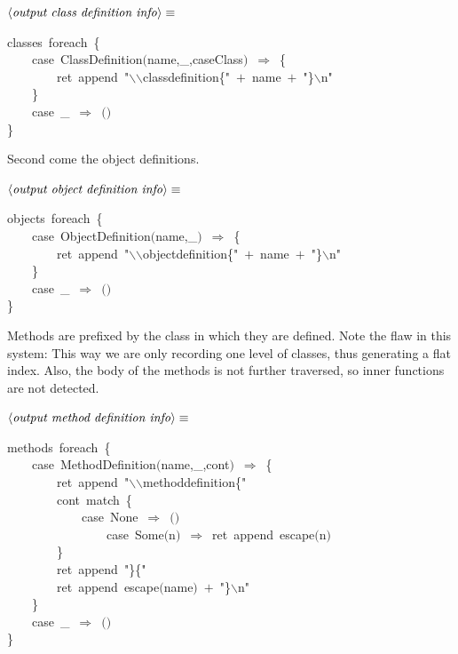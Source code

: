 \documentclass[a4paper,12pt]{article}
\begin{document}
$\left<\mbox{\emph{output class definition info}}\right>\equiv$
\begin{program}classes~foreach~{\small\{}
\\~~~~{\vem case}~ClassDefinition$($name,\_,caseClass$)$~$\Rightarrow$~{\small\{}
\\~~~~~~~~ret~append~"$\backslash$$\backslash$classdefinition{\small\{}"~$+$~name~$+$~"{\small\}}$\backslash$n"
\\~~~~{\small\}}
\\~~~~{\vem case}~\_~$\Rightarrow$~$($$)$
\\{\small\}}
\\[0.5em]\end{program}


Second come the object definitions.

$\left<\mbox{\emph{output object definition info}}\right>\equiv$
\begin{program}objects~foreach~{\small\{}
\\~~~~{\vem case}~ObjectDefinition$($name,\_$)$~$\Rightarrow$~{\small\{}
\\~~~~~~~~ret~append~"$\backslash$$\backslash$objectdefinition{\small\{}"~$+$~name~$+$~"{\small\}}$\backslash$n"
\\~~~~{\small\}}
\\~~~~{\vem case}~\_~$\Rightarrow$~$($$)$
\\{\small\}}
\\[0.5em]\end{program}


Methods are prefixed by the class in which they are defined. Note
the flaw in this system: This way we are only recording one level
of classes, thus generating a flat index. Also, the body of the
methods is not further traversed, so inner functions are not
detected.

$\left<\mbox{\emph{output method definition info}}\right>\equiv$
\begin{program}methods~foreach~{\small\{}
\\~~~~{\vem case}~MethodDefinition$($name,\_,cont$)$~$\Rightarrow$~{\small\{}
\\~~~~~~~~ret~append~"$\backslash$$\backslash$methoddefinition{\small\{}"
\\~~~~~~~~cont~{\vem match}~{\small\{}
\\~~~~~~~~~~~~{\vem case}~None~$\Rightarrow$~$($$)$
\\~~~~~~~~~~~~~~~~{\vem case}~Some$($n$)$~$\Rightarrow$~ret~append~escape$($n$)$
\\~~~~~~~~{\small\}}
\\~~~~~~~~ret~append~"{\small\}}{\small\{}"
\\~~~~~~~~ret~append~escape$($name$)$~$+$~"{\small\}}$\backslash$n"
\\~~~~{\small\}}
\\~~~~{\vem case}~\_~$\Rightarrow$~$($$)$
\\{\small\}}
\\[0.5em]\end{program}
\end{document}
